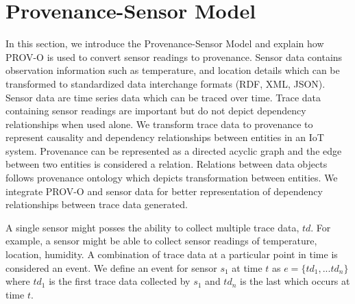 %
%
%
%
%
%
%
%






\section {Provenance-Sensor Model}
In this section, we introduce the Provenance-Sensor Model and explain how PROV-O is used to convert sensor readings to provenance. Sensor data contains observation information such as temperature, and location details which can be transformed to standardized data interchange formats (RDF, XML, JSON). Sensor data are time series data which can be traced over time. Trace data containing sensor readings are important but do not depict dependency relationships when used alone. We transform trace data to provenance to represent causality and dependency relationships between entities in an IoT system. Provenance can be represented as a directed acyclic graph and the edge between two entities is considered a relation. Relations between data objects follows provenance ontology which depicts transformation between entities. We integrate PROV-O and sensor data for better representation of dependency relationships between trace data generated.

\par A single sensor might posses the ability to collect multiple trace data, $td$. For example, a sensor might be able to collect sensor readings of temperature, location, humidity. A combination of trace data at a particular point in time is considered an event. We define an event  for sensor $s_1$ at time $t$ as $e= \{td_1, ...td_n\} $ where $td_1$ is the first trace data collected by $s_1$  and $td_n$ is the last which occurs at time $t$.





